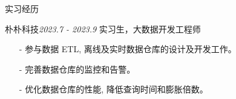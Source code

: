 \documentclass{resume} %
\begin{document}
\begin{rSection}{实习经历}

\begin{rSubsection}{朴朴科技}{\em 2023.7 - 2023.9}
    {实习生，大数据开发工程师}
    {}
    \item[]
    \begin{itemize}
        \setlength\itemsep{-0.5em}
        \item[-] 参与数据 ETL, 离线及实时数据仓库的设计及开发工作。
        \item[-] 完善数据仓库的监控和告警。
        \item[-] 优化数据仓库的性能, 降低查询时间和膨胀倍数。
    \end{itemize}
\end{rSubsection}

\end{rSection}

\end{document}
